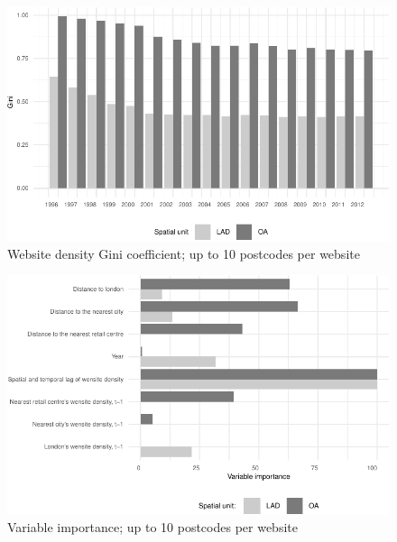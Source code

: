 \documentclass[
  authoryear,
  preprint,
  3p]{elsarticle}
\begin{document}
\begin{figure}[H]

{\centering \includegraphics[width=1\textwidth,height=\textheight]{tranos2025_files/figure-pdf/gini10-1.pdf}

}

\caption{\label{gini10}Website density Gini coefficient; up to 10
postcodes per website}

\end{figure}%

\begin{figure}[H]

{\centering \includegraphics[width=1\textwidth,height=0.6\textheight]{tranos2025_files/figure-pdf/varimp10-1.pdf}

}

\caption{\label{var.imp10}Variable importance; up to 10 postcodes per
website}

\end{figure}%
\end{document}
